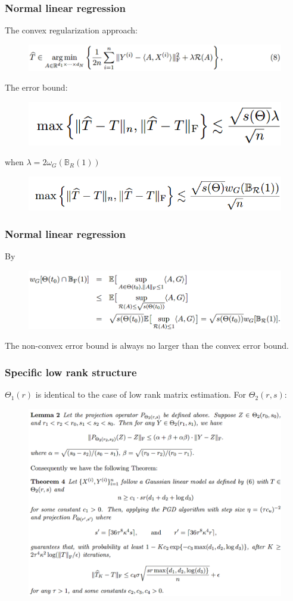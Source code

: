 \documentclass{beamer}
\begin{document}
	\begin{frame}
		\frametitle{Normal linear regression}
		The convex regularization approach:
		\begin{figure}
			\includegraphics[width=.8\linewidth]{image024.png}
		\end{figure}
		The error bound:
		\begin{figure}
			\includegraphics[width=.5\linewidth]{image025.png}
		\end{figure}
		when $\lambda=2\omega_G(\mathbb{B}_R(1))$
		\begin{figure}
			\includegraphics[width=.6\linewidth]{image026.png}
		\end{figure}
	\end{frame}
	
	\begin{frame}
		\frametitle{Normal linear regression}
		By
		\begin{figure}
			\includegraphics[width=.9\linewidth]{image027.png}
		\end{figure}
		The non-convex error bound is always no larger than the convex error bound.
	\end{frame}
	
	\begin{frame}
		\frametitle{Specific low rank structure}
		$\Theta_1(r)$ is identical to the case of low rank matrix estimation. For $\Theta_2(r,s)$:
		\begin{figure}
			\includegraphics[width=.7\linewidth]{image028.png}
		\end{figure}
	
	\end{frame}
	
\end{document}
